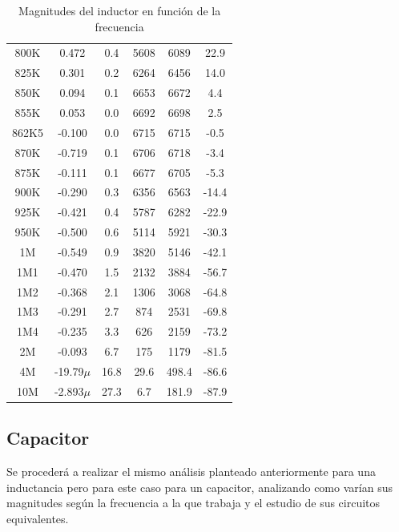 \documentclass[11pt, a4paper]{article}
\begin{document}
\begin{center}
\begin{table}[H]
\begin{tabular}{ c c c c c c }
				800K  & 0.472       & 0.4 		 & 5608 	& 6089  & 22.9       \\
				825K  & 0.301       & 0.2  		& 6264 		& 6456  & 14.0       \\
				850K  & 0.094        & 0.1  	& 6653		& 6672  & 4.4        \\
				855K  & 0.053       & 0.0  		  & 6692	 & 6698  & 2.5        \\
				862K5 & -0.100         & 0.0    & 6715 		& 6715  & -0.5       \\
				870K  & -0.719       & 0.1 		 & 6706 	& 6718  & -3.4        \\
				875K  & -0.111      & 0.1  		& 6677 		& 6705  & -5.3       \\
				900K  & -0.290      & 0.3  		& 6356 		& 6563  & -14.4      \\
				925K  & -0.421      & 0.4 		 & 5787		 & 6282  & -22.9      \\
				950K  & -0.500         & 0.6  	& 5114 		& 5921  & -30.3       \\
				1M    & -0.549      & 0.9  		& 3820		 & 5146  & -42.1      \\
				1M1  & -0.470      & 1.5  		& 2132		 & 3884  & -56.7      \\
				1M2  & -0.368      & 2.1  		& 1306 		& 3068  & -64.8      \\
				1M3   & -0.291      & 2.7  		& 874  		& 2531  & -69.8      \\
				1M4  & -0.235      & 3.3 		 & 626  	& 2159  & -73.2     \\
				2M    & -0.093      & 6.7 		 & 175 		 & 1179  & -81.5       \\
				4M    & -19.79$\mu$  & 16.8 		& 29.6		 & 498.4 & -86.6     \\
				10M   & -2.893$\mu$ & 27.3 		& 6.7  		& 181.9 & -87.9     \\
            \hline 
        \end{tabular}
        \caption{Magnitudes del inductor en función de la frecuencia}
        \label{table:Rta_en_frecuencia_inductor}
    \end{table}
\end{center}
\subsection{Capacitor}
Se procederá a realizar el mismo análisis planteado anteriormente para una inductancia pero para este caso para un capacitor, analizando como varían sus magnitudes según la frecuencia a la que trabaja y el estudio de sus circuitos equivalentes.
\end{document}
